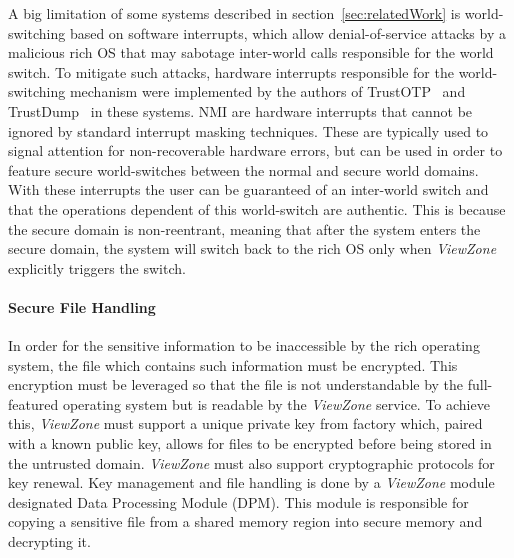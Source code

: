 A big limitation of some systems described in section~\ref{sec:relatedWork} is world-switching based on software interrupts, which allow denial-of-service attacks by a malicious rich OS that may sabotage inter-world calls responsible for the world switch. To mitigate such attacks, hardware interrupts responsible for the world-switching mechanism were implemented by the authors of TrustOTP~\cite{sun2015trustotp} and TrustDump~\cite{sun2015reliable} in these systems. \ac{NMI} are hardware interrupts that cannot be ignored by standard interrupt masking techniques. These are typically used to signal attention for non-recoverable hardware errors, but can be used in order to feature secure world-switches between the normal and secure world domains. With these interrupts the user can be guaranteed of an inter-world switch and that the operations dependent of this world-switch are authentic. This is because the secure domain is non-reentrant, meaning that after the system enters the secure domain, the system will switch back to the rich OS only when \emph{ViewZone} explicitly triggers the switch.

\paragraph{\textbf{Secure File Handling}}


In order for the sensitive information to be inaccessible by the rich operating system, the file which contains such information must be encrypted. This encryption must be leveraged so that the file is not understandable by the full-featured operating system but is readable by the \emph{ViewZone} service. To achieve this, \emph{ViewZone} must support a unique private key from factory which, paired with a known public key, allows for files to be encrypted before being stored in the untrusted domain. \emph{ViewZone} must also support cryptographic protocols for key renewal. Key management and file handling is done by a \emph{ViewZone} module designated Data Processing Module (DPM). This module is responsible for copying a sensitive file from a shared memory region into secure memory and decrypting it.


